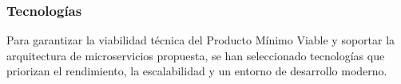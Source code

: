 \subsubsection*{Tecnologías}

Para garantizar la viabilidad técnica del Producto Mínimo Viable y soportar la arquitectura de microservicios propuesta, se han seleccionado tecnologías que priorizan el rendimiento, la escalabilidad y un entorno de desarrollo moderno.

